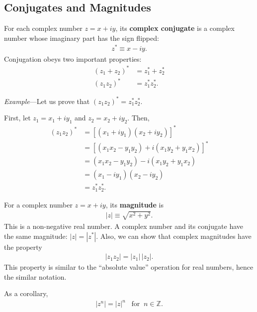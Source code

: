 \documentclass[10pt,a4paper]{article}
\begin{document}
\subsection{Conjugates and Magnitudes}
\label{conjugates-and-magnitudes}

For each complex number $z = x + iy$, its \textbf{complex conjugate}
is a complex number whose imaginary part has the sign flipped:
\begin{align}
  z^* \equiv x - i y.
\end{align}
Conjugation obeys two important properties:
\begin{align}
  (z_1 + z_2)^* &= z_1^* + z_2^* \\
  (z_1 z_2)^* &= z_1^* z_2^*.
\end{align}

\begin{framed}\noindent
  \textit{Example}---Let us prove that $(z_1 z_2)^* = z_1^* z_2^*$.

  First, let $z_1 = x_1 + i y_1$ and $z_2 = x_2 + i y_2$.  Then,
  \begin{align}
    (z_1 z_2)^* &= \left[(x_1+iy_1)(x_2+iy_2)\right]^* \\
    &= \left[\left(x_1 x_2 - y_1 y_2\right) + i\left(x_1y_2+y_1x_2\right)\right]^* \\
    &= \left(x_1 x_2 - y_1 y_2\right) - i\left(x_1y_2+y_1x_2\right) \\
    &= \left(x_1 - i y_1\right)\left(x_2 - i y_2\right) \\
    &= z_1^* z_2^*.
  \end{align}
\end{framed}

For a complex number $z = x + i y$, its \textbf{magnitude} is
\begin{align}
  |z| \equiv \sqrt{x^2 + y^2}.
\end{align}
This is a non-negative real number. A complex number and its conjugate
have the same magnitude: $|z| = |z^*|$.  Also, we can show that
complex magnitudes have the property
\begin{align}
  |z_1 z_2| = |z_1| \, |z_2|.
\end{align}
This property is similar to the ``absolute value'' operation for real
numbers, hence the similar notation.

As a corollary,
\begin{align}
  |z^n| = |z|^n \;\;\;\textrm{for}\;\;n \in \mathbb{Z}.
\end{align}
\end{document}
